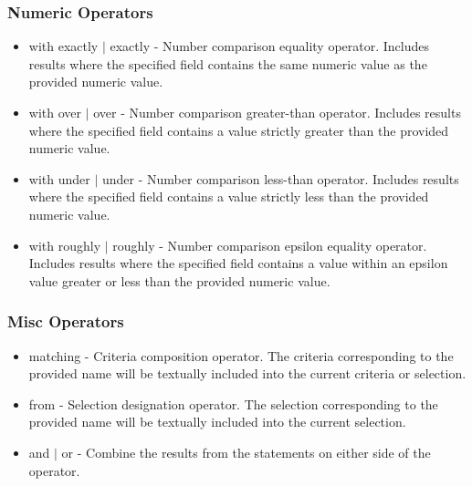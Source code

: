 \subsubsection{Numeric Operators}
\begin{itemize}
\item with exactly $|$ exactly - Number comparison equality operator. Includes results where the specified field contains the same numeric value as the provided numeric value.
\item with over $|$ over - Number comparison greater-than operator. Includes results where the specified field contains a value strictly greater than the provided numeric value.
\item with under $|$ under - Number comparison less-than operator. Includes results where the specified field contains a value strictly less than the provided numeric value.
\item with roughly $|$ roughly - Number comparison epsilon equality operator. Includes results where the specified field contains a value within an epsilon value greater or less than the provided numeric value.
\end{itemize}
\subsubsection{Misc Operators}
\begin{itemize}
\item matching - Criteria composition operator. The criteria corresponding to the provided name will be textually included into the current criteria or selection.
\item from - Selection designation operator. The selection corresponding to the provided name will be textually included into the current selection.
\item and $|$ or - Combine the results from the statements on either side of the operator.
\end{itemize}

